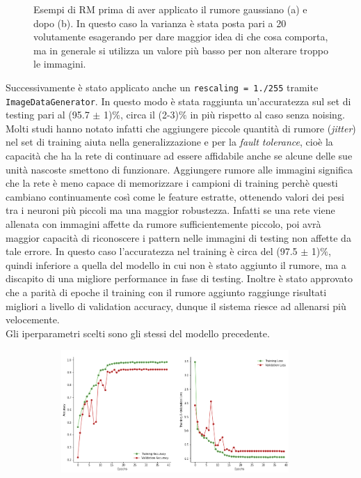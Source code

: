 \begin{enumerate}
\begin{figure}[H]
\begin{subfigure}{0.5\textwidth}
        \caption{}
        \label{fig:snap2}
      \end{subfigure}%
      \caption{Esempi di RM prima di aver applicato il rumore gaussiano (a) e dopo (b). In questo caso la varianza è stata posta pari a 20 volutamente esagerando per dare maggior idea di che cosa comporta, ma 
      in generale si utilizza un valore più basso per non alterare troppo le immagini.}
      \label{fig:fig}
\end{figure} 
    Successivamente è stato applicato anche un \lstinline{rescaling = 1./255} tramite \lstinline{ImageDataGenerator}.
    In questo modo è stata raggiunta un'accuratezza sul set di testing pari al (95.7 $\pm$ 1)$\%$, circa il (2-3)$\%$ in più
     rispetto al caso senza noising.
    Molti studi hanno notato infatti che aggiungere piccole quantità 
    di rumore (\emph{jitter}) nel set di training aiuta nella generalizzazione
    e per la \emph{fault tolerance}, cioè la capacità che ha la rete di continuare ad essere affidabile anche se alcune
    delle sue unità nascoste smettono di funzionare. Aggiungere rumore alle immagini significa che la rete è meno
    capace di memorizzare i campioni di training perchè questi cambiano continuamente così come le feature estratte,
    ottenendo valori dei pesi tra i neuroni più piccoli ma una maggior robustezza. Infatti se una rete viene allenata
     con immagini 
     affette da rumore sufficientemente piccolo, poi avrà maggior capacità di riconoscere i pattern nelle
      immagini di testing non affette da tale errore.
    In questo caso l'accuratezza nel training è circa del (97.5 $\pm$ 1)$\%$, quindi inferiore a quella del modello in cui non 
    è stato aggiunto il rumore, ma a discapito di una migliore performance in fase di testing. Inoltre è stato
     approvato che a parità di epoche
    il training con il rumore aggiunto raggiunge risultati migliori a livello di validation accuracy, dunque il sistema riesce ad allenarsi più velocemente. \\
    Gli iperparametri scelti sono gli stessi del modello precedente.
    \begin{figure}[hb!]
      \begin{subfigure}{0.5\textwidth}
        \centering
        \includegraphics[width=0.95\textwidth]{Figures/history-alexnet-original.png}

\end{subfigure}
\end{figure}
\end{enumerate}
